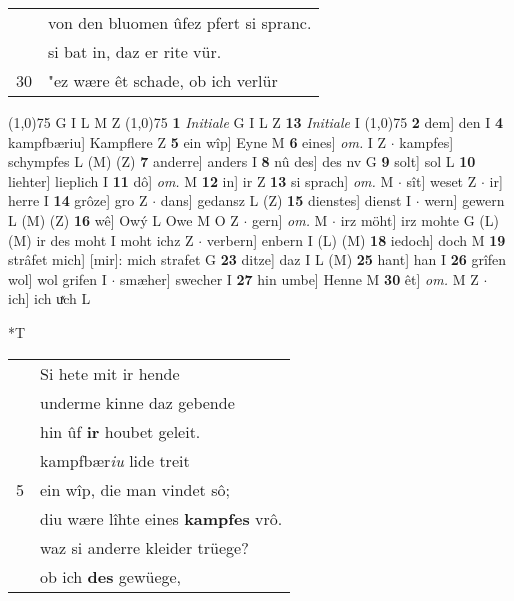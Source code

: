 \documentclass[8pt,a4paper,notitlepage]{article}
\begin{document}
\begin{table}[ht]
\begin{minipage}[t]{0.5\linewidth}
\begin{tabular}{rl}
 & von den bluomen ûfez pfert si spranc.\\ 
 & si bat in, daz er rite vür.\\ 
30 & "ez wære êt schade, ob ich verlür\\ 
\end{tabular}
\scriptsize
\line(1,0){75} \newline
G I L M Z \newline
\line(1,0){75} \newline
\textbf{1} \textit{Initiale} G I L Z  \textbf{13} \textit{Initiale} I  \newline
\line(1,0){75} \newline
\textbf{2} dem] den I \textbf{4} kampfbæriu] Kampflere Z \textbf{5} ein wîp] Eyne M \textbf{6} eines] \textit{om.} I Z  $\cdot$ kampfes] schympfes L (M) (Z) \textbf{7} anderre] anders I \textbf{8} nû des] des nv G \textbf{9} solt] sol L \textbf{10} liehter] lieplich I \textbf{11} dô] \textit{om.} M \textbf{12} in] ir Z \textbf{13} si sprach] \textit{om.} M  $\cdot$ sît] weset Z  $\cdot$ ir] herre I \textbf{14} grôze] gro Z  $\cdot$ dans] gedansz L (Z) \textbf{15} dienstes] dienst I  $\cdot$ wern] gewern L (M) (Z) \textbf{16} wê] Owý L Owe M O Z  $\cdot$ gern] \textit{om.} M  $\cdot$ irz möht] irz mohte G (L) (M) ir des moht I moht ichz Z  $\cdot$ verbern] enbern I (L) (M) \textbf{18} iedoch] doch M \textbf{19} strâfet mich] [mir]: mich strafet G \textbf{23} ditze] daz I L (M) \textbf{25} hant] han I \textbf{26} grîfen wol] wol grifen I  $\cdot$ smæher] swecher I \textbf{27} hin umbe] Henne M \textbf{30} êt] \textit{om.} M Z  $\cdot$ ich] ich uͯch L \newline
\end{minipage}
\hspace{0.5cm}
\begin{minipage}[t]{0.5\linewidth}
\small
\begin{center}*T
\end{center}
\begin{tabular}{rl}
 & Si hete mit ir hende\\ 
 & underme kinne daz gebende\\ 
 & hin ûf \textbf{ir} houbet geleit.\\ 
 & kampfbær\textit{iu} lide treit\\ 
5 & ein wîp, die man vindet sô;\\ 
 & diu wære lîhte eines \textbf{kampfes} vrô.\\ 
 & waz si anderre kleider trüege?\\ 
 & ob ich \textbf{des} gewüege,\\ 

\end{tabular}
\end{minipage}
\end{table}
\end{document}
